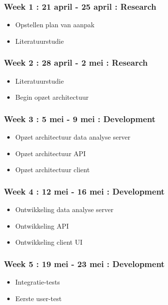 \subsubsection*{Week 1 : 21 april - 25 april : Research}
\begin{itemize}
\item Opstellen plan van aanpak
\item Literatuurstudie
\end{itemize}

\subsubsection*{Week 2 : 28 april - 2 mei : Research}
\begin{itemize}
\item Literatuurstudie
\item Begin opzet architectuur
\end{itemize}

\subsubsection*{Week 3 : 5 mei - 9 mei : Development}
\begin{itemize}
\item Opzet architectuur data analyse server
\item Opzet architectuur API
\item Opzet architectuur client
\end{itemize}

\subsubsection*{Week 4 : 12 mei - 16 mei : Development}
\begin{itemize}
\item Ontwikkeling data analyse server
\item Ontwikkeling API
\item Ontwikkeling client UI
\end{itemize}

\subsubsection*{Week 5 : 19 mei - 23 mei : Development}
\begin{itemize}
\item Integratie-tests
\item Eerste user-test
\end{itemize}

